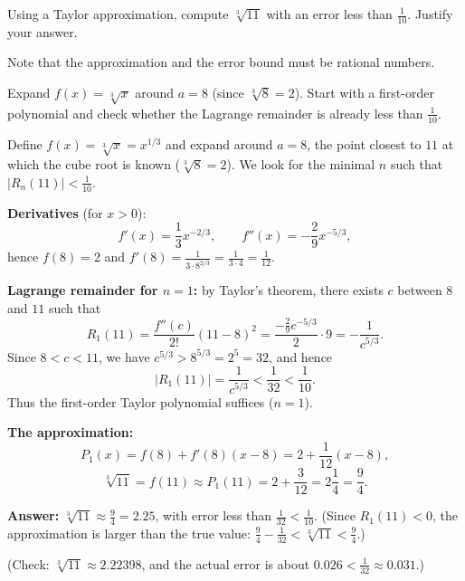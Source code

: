 
\begin{question}
Using a Taylor approximation, compute $\sqrt[3]{11}$ with an error less than $\frac{1}{10}$. Justify your answer.

Note that the approximation and the error bound must be rational numbers.
\end{question}

\begin{hint}
Expand $f(x) = \sqrt[3]{x}$ around $a = 8$ (since $\sqrt[3]{8} = 2$). Start with a first-order polynomial and check whether the Lagrange remainder is already less than $\frac{1}{10}$.
\end{hint}

\begin{solution}
Define $f(x) = \sqrt[3]{x} = x^{1/3}$ and expand around $a = 8$, the point closest to $11$ at which the cube root is known ($\sqrt[3]{8} = 2$). We look for the minimal $n$ such that $|R_n(11)| < \frac{1}{10}$.

\textbf{Derivatives} (for $x > 0$):
\[ f'(x) = \frac13 x^{-2/3}, \qquad f''(x) = -\frac29 x^{-5/3}, \]
hence $f(8) = 2$ and $f'(8) = \frac{1}{3\cdot 8^{2/3}} = \frac{1}{3\cdot 4} = \frac{1}{12}$.

\textbf{Lagrange remainder for $n = 1$:} by Taylor's theorem, there exists $c$ between $8$ and $11$ such that
\[ R_1(11) = \frac{f''(c)}{2!}(11 - 8)^2 = \frac{-\frac29 c^{-5/3}}{2}\cdot 9 = -\frac{1}{c^{5/3}}. \]
Since $8 < c < 11$, we have $c^{5/3} > 8^{5/3} = 2^5 = 32$, and hence
\[ |R_1(11)| = \frac{1}{c^{5/3}} < \frac{1}{32} < \frac{1}{10}. \]
Thus the first-order Taylor polynomial suffices ($n = 1$).

\textbf{The approximation:}
\[ P_1(x) = f(8) + f'(8)(x - 8) = 2 + \frac{1}{12}(x - 8), \]
\[ \sqrt[3]{11} = f(11) \approx P_1(11) = 2 + \frac{3}{12} = 2\frac14 = \frac94. \]

\textbf{Answer:} $\sqrt[3]{11} \approx \frac{9}{4} = 2.25$, with error less than $\frac{1}{32} < \frac{1}{10}$. (Since $R_1(11) < 0$, the approximation is larger than the true value: $\frac94 - \frac{1}{32} < \sqrt[3]{11} < \frac94$.)

(Check: $\sqrt[3]{11} \approx 2.22398$, and the actual error is about $0.026 < \frac{1}{32} \approx 0.031$.)
\end{solution}
